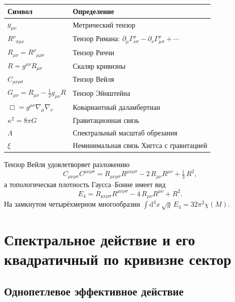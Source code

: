 \documentclass[12pt,a4paper]{article}
\newcommand{\Weylsq}{C_{\mu\nu\rho\sigma}C^{\mu\nu\rho\sigma}}
\newcommand{\Ricsq}{R_{\mu\nu}R^{\mu\nu}}
\newcommand{\Riemsq}{R_{\mu\nu\rho\sigma}R^{\mu\nu\rho\sigma}}
\newcommand{\dd}{\mathrm{d}}
\newcommand{\Lam}{\Lambda}
\theoremstyle{plain}
\theoremstyle{definition}
\begin{document}
\begin{center}
\begin{tabular}{ll}
\toprule
Символ & Определение \\
\midrule
$g_{\mu\nu}$ & Метрический тензор \\
$R^{\rho}{}_{\sigma\mu\nu}$ & Тензор Римана:
  $\partial_\mu\Gamma^{\rho}_{\nu\sigma}
  - \partial_\nu\Gamma^{\rho}_{\mu\sigma} + \cdots$ \\
$R_{\mu\nu} = R^{\rho}{}_{\mu\rho\nu}$ & Тензор Риччи \\
$R = g^{\mu\nu}R_{\mu\nu}$ & Скаляр кривизны \\
$C_{\mu\nu\rho\sigma}$ & Тензор Вейля \\
$G_{\mu\nu} = R_{\mu\nu} - \tfrac{1}{2}g_{\mu\nu}R$ & Тензор Эйнштейна \\
$\Box = g^{\mu\nu}\nabla_\mu\nabla_\nu$ & Ковариантный даламбертиан \\
$\kappa^2 = 8\pi G$ & Гравитационная связь \\
$\Lam$ & Спектральный масштаб обрезания \\
$\xi$ & Неминимальная связь Хиггса с гравитацией \\
\bottomrule
\end{tabular}
\end{center}

\noindent
Тензор Вейля удовлетворяет разложению
\begin{equation}\label{eq:weyl-decomp}
  \Weylsq = \Riemsq - 2\,\Ricsq + \tfrac{1}{3}\,R^2,
\end{equation}
а топологическая плотность Гаусса--Бонне имеет вид
\begin{equation}\label{eq:GB-density}
  E_4 = \Riemsq - 4\,\Ricsq + R^2.
\end{equation}
На замкнутом четырёхмерном многообразии
$\int \dd^4x\,\sqrt{g}\,E_4 = 32\pi^2\chi(M)$.

\section{Спектральное действие и его квадратичный по кривизне сектор}
\label{sec:spectral-action}

\subsection{Однопетлевое эффективное действие}
\end{document}

